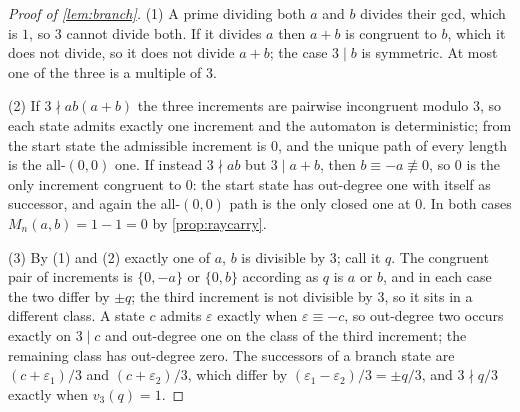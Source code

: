\documentclass[11pt]{amsart}
\theoremstyle{definition}
\theoremstyle{remark}
\begin{document}
\begin{proof}[Proof of \cref{lem:branch}]
(1) A prime dividing both $a$ and $b$ divides their gcd, which is $1$, so $3$ cannot divide both. If it divides $a$ then $a+b$ is congruent to $b$, which it does not divide, so it does not divide $a+b$; the case $3\mid b$ is symmetric. At most one of the three is a multiple of $3$.

(2) If $3\nmid ab(a+b)$ the three increments are pairwise incongruent modulo $3$, so each state admits exactly one increment and the automaton is deterministic; from the start state the admissible increment is $0$, and the unique path of every length is the all-$(0,0)$ one. If instead $3\nmid ab$ but $3\mid a+b$, then $b\equiv-a\not\equiv 0$, so $0$ is the only increment congruent to $0$: the start state has out-degree one with itself as successor, and again the all-$(0,0)$ path is the only closed one at $0$. In both cases $M_n(a,b)=1-1=0$ by \cref{prop:raycarry}.

(3) By (1) and (2) exactly one of $a$, $b$ is divisible by $3$; call it $q$. The congruent pair of increments is $\{0,-a\}$ or $\{0,b\}$ according as $q$ is $a$ or $b$, and in each case the two differ by $\pm q$; the third increment is not divisible by $3$, so it sits in a different class. A state $c$ admits $\varepsilon$ exactly when $\varepsilon\equiv-c$, so out-degree two occurs exactly on $3\mid c$ and out-degree one on the class of the third increment; the remaining class has out-degree zero. The successors of a branch state are $(c+\varepsilon_1)/3$ and $(c+\varepsilon_2)/3$, which differ by $(\varepsilon_1-\varepsilon_2)/3=\pm q/3$, and $3\nmid q/3$ exactly when $v_3(q)=1$.
\end{proof}
\end{document}
